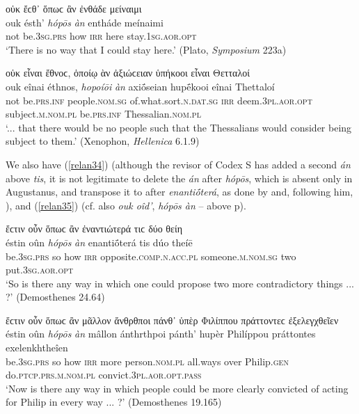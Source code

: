 \begin{exe}
\ex οὐκ ἔϲθ᾽ ὅπωϲ ἂν ἐνθάδε μείναιμι\\
\gll ouk ésth' \emph{hópōs} \emph{àn} entháde meínaimi\\
not be.\textsc{3sg.prs} how \textsc{irr} here stay.\textsc{1sg.aor.opt}\\
\trans `There is no way that I could stay here.' (Plato, \textit{Symposium} 223a)
\label{relan32}
\end{exe}

\begin{exe}
\ex οὐκ εἶναι ἔθνοϲ, ὁποίῳ ὰν ἀξιώϲειαν ὑπήκοοι εἶναι Θετταλοί\\
\gll ouk eînai éthnos, \emph{hopoíōi} \emph{àn} axiṓseian hupḗkooi eînai Thettaloí\\
not be.\textsc{prs.inf} people.\textsc{nom.sg} of.what.sort.\textsc{n.dat.sg} \textsc{irr} deem.\textsc{3pl.aor.opt} subject.\textsc{m.nom.pl} be.\textsc{prs.inf}
Thessalian.\textsc{nom.pl}\\
\trans `... that there would be no people such that the Thessalians would consider being subject to them.' (Xenophon, \textit{Hellenica} 6.1.9)
\label{relan33}
\end{exe}

We also have (\ref{relan34}) (although the revisor of Codex S has added a second \emph{án} above \emph{tis}, it is not legitimate to delete the \emph{án} after \emph{hópōs}, which is absent only in Augustanus, and transpose it to after \emph{enantiṓterá}, as done by \citealp[103]{Weil1886} and, following him, \citealp{DindorfBlass1888}), and (\ref{relan35}) (cf. also \emph{ouk oîd'}, \emph{hópōs àn} -- above p\pageref{oposan}).

\begin{exe}
\ex ἔϲτιν οὖν ὅπωϲ ἂν ἐναντιώτερά τιϲ δύο θείη\\
\gll éstin oûn \emph{hópōs} \emph{àn} enantiṓterá tis dúo theíē\\
be.\textsc{3sg.prs} so how \textsc{irr} opposite.\textsc{comp.n.acc.pl} someone.\textsc{m.nom.sg} two put.\textsc{3sg.aor.opt}\\
\trans `So is there any way in which one could propose two more contradictory things ... ?' (Demosthenes 24.64)
\label{relan34}
\end{exe}

\begin{exe}
\ex ἔϲτιν οὖν ὅπωϲ ἂν μᾶλλον ἄνθρθποι πάνθ᾽ ὑπὲρ Φιλίππου πράττοντεϲ ἐξελεγχθεῖεν\\
\gll éstin oûn \emph{hópōs} \emph{àn} mâllon ánthrthpoi pánth' hupèr Philíppou práttontes exelenkhtheîen\\
be.\textsc{3sg.prs} so how \textsc{irr} more person.\textsc{nom.pl} all.ways over Philip.\textsc{gen} do.\textsc{ptcp.prs.m.nom.pl} convict.\textsc{3pl.aor.opt.pass}\\
\trans `Now is there any way in which people could be more clearly convicted of acting for Philip in every way ... ?' (Demosthenes 19.165)
\label{relan35}
\end{exe}

